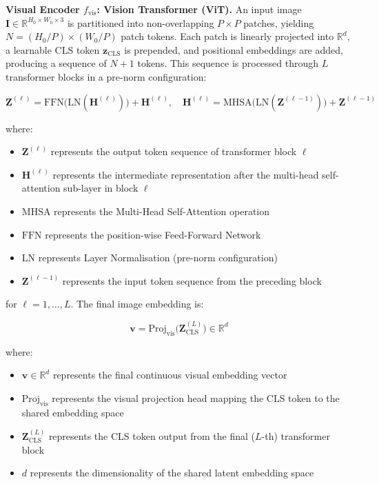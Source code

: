 \textbf{Visual Encoder $f_{\text{vis}}$: Vision Transformer (ViT).} An input image $\mathbf{I} \in \mathbb{R}^{H_0 \times W_0 \times 3}$ is partitioned into non-overlapping $P \times P$ patches, yielding $N = (H_0/P) \times (W_0/P)$ patch tokens.  Each patch is linearly projected into $\mathbb{R}^d$, a learnable CLS token $\mathbf{z}_{\text{CLS}}$ is prepended, and positional embeddings are added, producing a sequence of $N + 1$ tokens. This sequence is processed through $L$ transformer blocks in a pre-norm configuration:

$$
\mathbf{Z}^{(\ell)} = \text{FFN}\!\bigl(\text{LN}(\mathbf{H}^{(\ell)})\bigr) + \mathbf{H}^{(\ell)}, \quad \mathbf{H}^{(\ell)} = \text{MHSA}\!\bigl(\text{LN}(\mathbf{Z}^{(\ell-1)})\bigr) + \mathbf{Z}^{(\ell-1)}
$$

where:
\begin{itemize}
\item $\mathbf{Z}^{(\ell)}$ represents the output token sequence of transformer block $\ell$
\item $\mathbf{H}^{(\ell)}$ represents the intermediate representation after the multi-head self-attention sub-layer in block $\ell$
\item $\text{MHSA}$ represents the Multi-Head Self-Attention operation
\item $\text{FFN}$ represents the position-wise Feed-Forward Network
\item $\text{LN}$ represents Layer Normalisation (pre-norm configuration)
\item $\mathbf{Z}^{(\ell-1)}$ represents the input token sequence from the preceding block
\end{itemize}

for $\ell = 1, \ldots, L$. The final image embedding is:

$$
\mathbf{v} = \text{Proj}_{\text{vis}}\!\bigl(\mathbf{Z}^{(L)}_{\text{CLS}}\bigr) \in \mathbb{R}^d
$$

where:
\begin{itemize}
\item $\mathbf{v} \in \mathbb{R}^d$ represents the final continuous visual embedding vector
\item $\text{Proj}_{\text{vis}}$ represents the visual projection head mapping the CLS token to the shared embedding space
\item $\mathbf{Z}^{(L)}_{\text{CLS}}$ represents the CLS token output from the final ($L$-th) transformer block
\item $d$ represents the dimensionality of the shared latent embedding space
\end{itemize}

